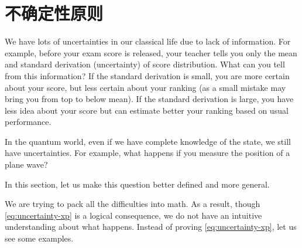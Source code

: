 \section{不确定性原则} \label{sec:uncertainty}

We have lots of uncertainties in our classical life due to lack of information. For example, before your exam score is released, your teacher tells you only the mean and standard derivation (uncertainty) of score distribution. What can you tell from this information? If the standard derivation is small, you are more certain about your score, but less certain about your ranking (as a small mistake may bring you from top to below mean). If the standard derivation is large, you have less idea about your score but can estimate better your ranking based on usual performance.

In the quantum world, even if we have complete knowledge of the state, we still have uncertainties. For example, what happens if you measure the position of a plane wave?

In this section, let us make this question better defined and more general.


We are trying to pack all the difficulties into math.  As a result, though \eqref{eq:uncertainty-xp} is a logical consequence, we do not have an intuitive understanding about what happens. Instead of proving \eqref{eq:uncertainty-xp}, let us see some examples.

